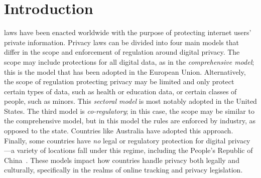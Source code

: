 \documentclass[conference]{IEEEtran}
\begin{document}
%
\IEEEpeerreviewmaketitle



\section{Introduction}
% 
% 
% 
% 
laws have been enacted worldwide with the purpose of protecting internet users' private information. Privacy laws can be divided into four main models
 \cite{IAPPbook} that differ in the scope and enforcement of regulation around digital privacy. The scope may include protections for all digital data, as in the \emph{comprehensive model}; this is the model that has been adopted in the European Union. Alternatively, the scope of regulation protecting privacy may be limited and only protect certain types of data, such as health or education data, or certain classes of people, such as minors.  This \emph{sectoral model} is most notably adopted in the United States.  The third model is \emph{co-regulatory}; in this case, the scope may be similar to the comprehensive model, but in this model the rules are enforced by industry, as opposed to the state. Countries like Australia have adopted this approach. Finally, some countries have \emph{no} legal or regulatory protection for digital privacy---a variety of locations fall under this regime, including the People's Republic of China~\cite{solove2006model, IAPPbook}. These models impact how countries handle privacy both legally and culturally, specifically in the realms of online tracking and privacy legislation. 
 
\end{document}
